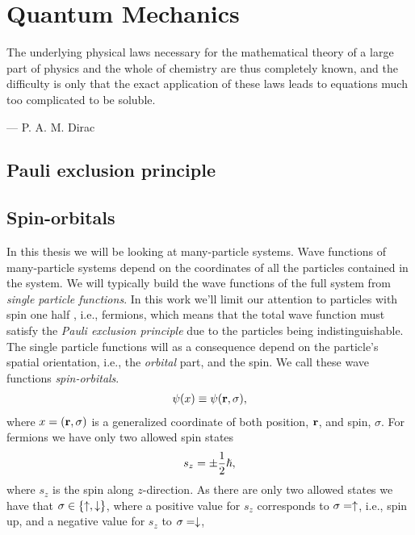 \chapter{Quantum Mechanics}
    \epigraph{The underlying physical laws necessary for the mathematical
    theory of a large part of physics and the whole of chemistry are thus
    completely known, and the difficulty is only that the exact application of
    these laws leads to equations much too complicated to be soluble.}
    {--- P. A. M. Dirac}

    \section{Pauli exclusion principle}

    \section{Spin-orbitals}
        In this thesis we will be looking at many-particle systems. Wave
        functions of many-particle systems depend on the coordinates of all the
        particles contained in the system. We will typically build the wave
        functions of the full system from \emph{single particle functions}. In
        this work we'll limit our attention to particles with spin one half ,
        i.e., fermions, which means that the total wave function must satisfy
        the \emph{Pauli exclusion principle} due to the particles being
        indistinguishable. The single particle functions will as a consequence
        depend on the particle's spatial orientation, i.e., the \emph{orbital}
        part, and the spin. We call these wave functions \emph{spin-orbitals}.
        \begin{align}
            \psi(x) \equiv \psi(\mathbf{r}, \sigma),
        \end{align}
        where $x = (\mathbf{r}, \sigma)$ is a generalized coordinate of both
        position, $\mathbf{r}$, and spin, $\sigma$. For fermions we have only two
        allowed spin states
        \begin{align}
            s_z = \pm \frac{1}{2}\hslash,
        \end{align}
        where $s_z$ is the spin along $z$-direction. As there are only two
        allowed states we have that $\sigma \in \left\{ \uparrow, \downarrow \right\}$,
        where a positive value for $s_z$ corresponds to $\sigma = \uparrow$,
        i.e., spin up, and a negative value for $s_z$ to $\sigma = \downarrow$,
